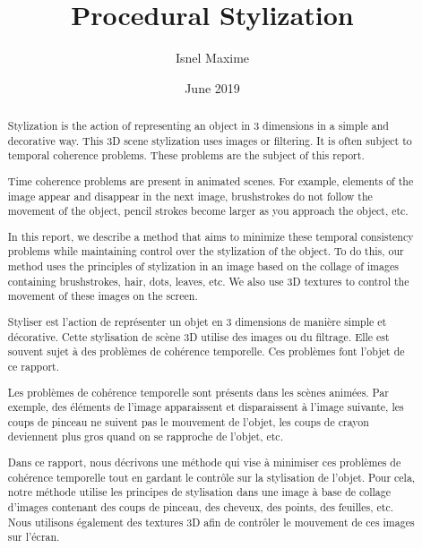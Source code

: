 \documentclass[12pt, a4paper]{memoir} %
\title{Procedural Stylization} %
\author{Isnel Maxime}
\date{June 2019} %
\begin{document}
\frontmatter
\begin{titlingpage}
\maketitle
\end{titlingpage}

\setlength{\parskip}{-1pt plus 1pt}

\renewcommand{\abstracttextfont}{\normalfont}
\abstractintoc
\begin{abstract}


Stylization is the action of representing an object in 3 dimensions in a simple and decorative way. This 3D scene stylization uses images or filtering. It is often subject to temporal coherence problems. These problems are the subject of this report.

Time coherence problems are present in animated scenes. For example, elements of the image appear and disappear in the next image, brushstrokes do not follow the movement of the object, pencil strokes become larger as you approach the object, etc.

In this report, we describe a method that aims to minimize these temporal consistency problems while maintaining control over the stylization of the object. To do this, our method uses the principles of stylization in an image based on the collage of images containing brushstrokes, hair, dots, leaves, etc. We also use 3D textures to control the movement of these images on the screen.

\end{abstract}
\abstractintoc



\renewcommand\abstractname{R\'esum\'e}
\begin{abstract} 

Styliser est l’action de représenter un objet en 3 dimensions de manière simple et décorative. Cette stylisation de scène 3D utilise des images ou du filtrage. Elle est souvent sujet à des problèmes de cohérence temporelle. Ces problèmes font l’objet de ce rapport. \newline

Les problèmes de cohérence temporelle sont présents dans les scènes animées. Par exemple, des éléments de l’image apparaissent et disparaissent à l’image suivante, les coups de pinceau ne suivent pas le mouvement de l’objet, les coups de crayon deviennent plus gros quand on se rapproche de l’objet, etc. \newline

Dans ce rapport, nous décrivons une méthode qui vise à minimiser ces problèmes de cohérence temporelle tout en gardant le contrôle sur la stylisation de l'objet. Pour cela, notre méthode utilise les principes de stylisation dans une image à base de collage d'images contenant des coups de pinceau, des cheveux, des points, des feuilles, etc. Nous utilisons également des textures 3D afin de contrôler le mouvement de ces images sur l'écran.

\end{abstract}
\end{document}

